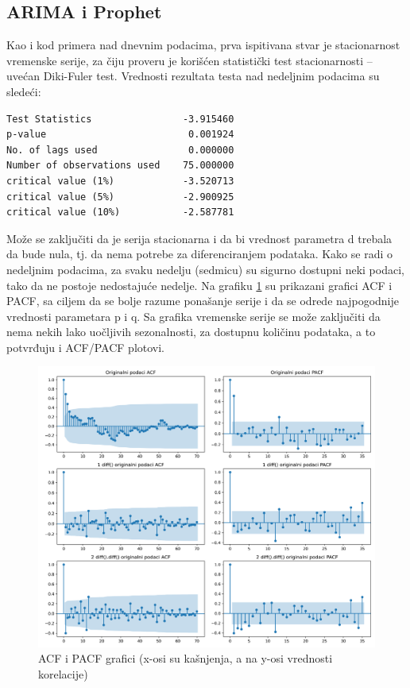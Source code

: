 \documentclass[12pt,oneside]{memoir}
\begin{document}
\subsection{ARIMA i Prophet}
Kao i kod primera nad dnevnim podacima, prva ispitivana stvar je stacionarnost vremenske serije, za čiju proveru je korišćen statistički test stacionarnosti -- uvećan Diki-Fuler test. Vrednosti rezultata testa nad nedeljnim podacima su sledeći:
\begin{minipage}{\linewidth}
\vspace{15pt}
\begin{verbatim}
Test Statistics                -3.915460
p-value                         0.001924
No. of lags used                0.000000
Number of observations used    75.000000
critical value (1%)            -3.520713
critical value (5%)            -2.900925
critical value (10%)           -2.587781
\end{verbatim}
\vspace{10pt}
\end{minipage}
Može se zaključiti da je serija stacionarna i da bi vrednost parametra d trebala da bude nula, tj. da nema potrebe za diferenciranjem podataka. Kako se radi o nedeljnim podacima, za svaku nedelju (sedmicu) su sigurno dostupni neki podaci, tako da ne postoje nedostajuće nedelje. Na grafiku \ref{fig: acf_pacf_nedeljni} su prikazani grafici ACF i PACF, sa ciljem da se bolje razume ponašanje serije i da se odrede najpogodnije vrednosti parametara p i q. Sa grafika vremenske serije se može zaključiti da nema nekih lako uočljivih sezonalnosti, za dostupnu količinu podataka, a to potvrđuju i ACF/PACF plotovi. 
\begin{figure}[!ht]
  \centering
  \includegraphics[width=1\textwidth]{./grafici/acf_pacf_nedeljni.png}
  \caption{ACF i PACF grafici (x-osi su kašnjenja, a na y-osi vrednosti korelacije)}
  \label{fig: acf_pacf_nedeljni}
\end{figure}
\end{document}
